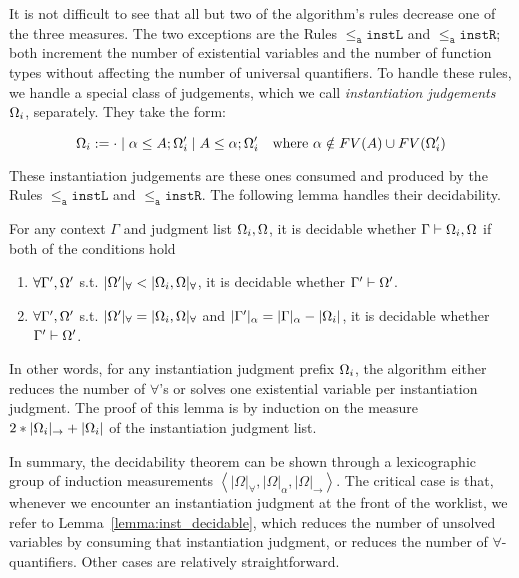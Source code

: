 It is not difficult to see that all but two of the algorithm's rules decrease
one of the three measures. The two exceptions are the Rules $\mathtt{{\le_a}instL}$ and $\mathtt{{\le_a}instR}$; both increment the number of existential
variables and the number of function types without affecting the number of
universal quantifiers.
To handle these rules, we handle a special class of judgements, which
we call \emph{instantiation judgements} $\exps_i$, separately. They 
take the form:
\begin{definition}[$\exps_i$]
$$\Omega_i := \cdot \mid \alpha\le A ; \Omega_i' \mid A\le \alpha ; \Omega_i'
\quad\text{where } \alpha\notin FV(A)\cup FV(\Omega_i')$$
\end{definition}
These instantiation judgements are these ones consumed and
produced by the Rules $\mathtt{{\le_a}instL}$ and $\mathtt{{\le_a}instR}$.
The following lemma handles their decidability.
\begin{lemma}
	For any context $\Gamma$ and judgment list $\Omega_i, \Omega$, it is decidable whether $\Gamma\vdash \Omega_i,\Omega$ if both of the conditions hold
\begin{enumerate}[1)]
	\item $\forall \Gamma', \Omega'$ s.t. $|\Omega'|_\forall < |\Omega_i,\Omega|_\forall$, it is decidable whether $\Gamma'\vdash \Omega'$.
	\item $\forall \Gamma', \Omega'$ s.t. $|\Omega'|_\forall = |\Omega_i,\Omega|_\forall$ and $|\Gamma'|_\alpha = |\Gamma|_\alpha - |\Omega_i|$, it is decidable whether $\Gamma'\vdash \Omega'$.
\end{enumerate}
\label{lemma:inst_decidable}
\end{lemma}
In other words, for any instantiation judgment prefix $\exps_i$, the algorithm
either reduces the number of $\forall$'s or solves one existential variable per
instantiation judgment. The proof of this lemma is by induction on the measure
$2*|\Omega_i|_{\to} + |\Omega_i|$ of the instantiation judgment list.

In summary, the decidability theorem can be shown through a lexicographic group
of induction measurements $\left\langle|\Omega|_\forall, |\Omega|_\alpha,
|\Omega|_\to\right\rangle$. The critical case is that, whenever we
encounter an instantiation judgment at the front of the worklist, we refer to
Lemma~\ref{lemma:inst_decidable}, which reduces the number of unsolved
variables by consuming that instantiation judgment, or reduces the number of
$\forall$-quantifiers. Other cases are relatively straightforward.
